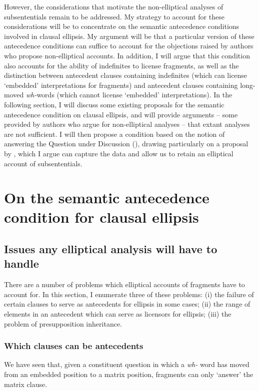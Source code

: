 \documentclass[doublespace]{umthesis}
\begin{document}
However, the considerations that motivate the non-elliptical analyses of subsententials remain to be addressed. My strategy to account for these considerations will be to concentrate on the semantic antecedence conditions involved in clausal ellipsis. My argument will be that a particular version of these antecedence conditions can suffice to account for the objections raised by authors who propose non-elliptical accounts. In addition, I will argue that this condition also accounts for the ability of indefinites to license fragments, as well as the distinction between antecedent clauses containing indefinites (which can license `embedded' interpretations for fragments) and antecedent clauses containing long-moved {\it wh-}words (which cannot license `embedded' interpretations). In the following section, I will discuss some existing proposals for the semantic antecedence condition on clausal ellipsis, and will provide arguments -- some provided by authors who argue for non-elliptical analyses -- that extant analyses are not sufficient. I will then propose a condition based on the notion of answering the Question under Discussion (\cite{RoQUD}), drawing particularly on a proposal by \cite{Re07}, which I argue can capture the data and allow us to retain an elliptical account of subsententials.

\section{On the semantic antecedence condition for clausal ellipsis}\label{sec-semantic-antecedence-condition}

\subsection{Issues any elliptical analysis will have to handle}

There are a number of problems which elliptical accounts of fragments have to account for. In this section, I enumerate three of these problems: (i) the failure of certain clauses to serve as antecedents for ellipsis in some cases; (ii) the range of elements in an antecedent which can serve as licensors for ellipsis; (iii) the problem of presupposition inheritance.

\subsubsection{Which clauses can be antecedents}

We have seen that, given a constituent question in which a {\it wh-} word has moved from an embedded position to a matrix position, fragments can only `answer' the matrix clause.
\end{document}
